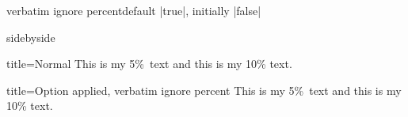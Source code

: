 \begin{docTcbKey}[][doc new=2017-07-05]{verbatim ignore percent}{}{default |true|, initially |false|}
\begin{marker}
\end{marker}

\begin{dispExample*}{sidebyside}
\def\percent{\%}

\begin{tcblisting}{title=Normal}
This is my 5\percent\ text
and this is my 10\% text.
\end{tcblisting}

\begin{tcblisting}{
  title=Option applied,
  verbatim ignore percent}
This is my 5\percent\ text
and this is my 10\% text.
\end{tcblisting}
\end{dispExample*}

\end{docTcbKey}

